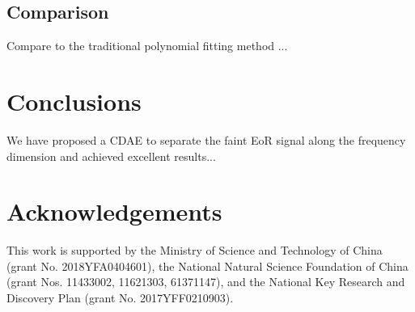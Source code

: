 \documentclass[letters,a4paper,fleqn,usenatbib]{mnras}
\begin{document}
\subsection{Comparison}
\label{sec:comparison}

Compare to the traditional polynomial fitting method ...


\section{Conclusions}
\label{sec:conclusions}

We have proposed a CDAE to separate the faint EoR signal along the
frequency dimension and achieved excellent results...


\section*{Acknowledgements}

This work is supported by
the Ministry of Science and Technology of China
(grant No. 2018YFA0404601),
the National Natural Science Foundation of China
(grant Nos. 11433002, 11621303, 61371147),
and the National Key Research and Discovery Plan
(grant No. 2017YFF0210903).










\bsp	%
\label{lastpage}
\end{document}
